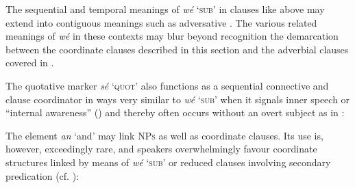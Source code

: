 The sequential and temporal meanings of \textit{wé} ‘\textsc{sub}’ in clauses like  above may extend into contiguous meanings such as adversative . The various related meanings of \textit{wé} in these contexts may blur beyond recognition the demarcation between the coordinate clauses described in this section and the adverbial clauses covered in .


\ea%
    \label{ex:key:1363}
\z\z

The quotative marker \textit{sé} ‘\textsc{quot}’ also functions as a sequential connective and clause coordinator in ways very similar to \textit{wé} ‘\textsc{sub}’ when it signals inner speech or “internal awareness” (\citealt[422]{Güldemann2008}) and thereby often occurs without an overt subject as in :


\ea%
    \label{ex:key:1364}
\z\z

The element \textit{an} ‘and’ may link \textsc{NPs} as well as coordinate clauses. Its use is, however, exceedingly rare, and speakers overwhelmingly favour coordinate structures linked by means of \textit{wé} ‘\textsc{sub}’ or reduced clauses involving secondary predication (cf. ):


